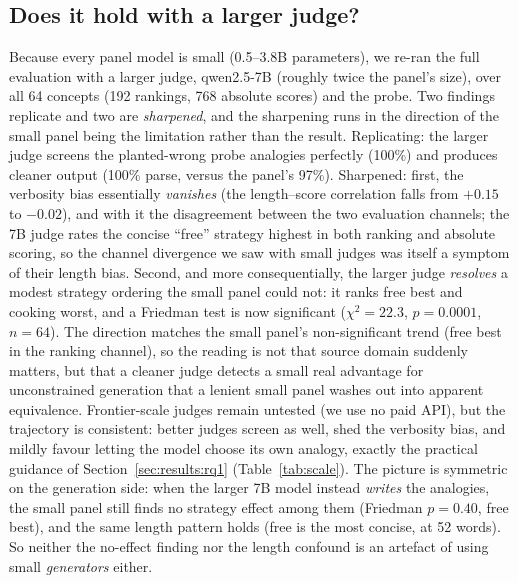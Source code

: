 \documentclass[11pt]{article}
\begin{document}
\subsection{Does it hold with a larger judge?}
\label{sec:results:scale}
Because every panel model is small (0.5--3.8B parameters), we re-ran the full evaluation with a
larger judge, qwen2.5-7B (roughly twice the panel's size), over all 64 concepts (192 rankings,
768 absolute scores) and the probe. Two findings replicate and two are \emph{sharpened}, and the
sharpening runs in the direction of the small panel being the limitation rather than the result.
Replicating: the larger judge screens the planted-wrong probe analogies perfectly (100\%) and
produces cleaner output (100\% parse, versus the panel's 97\%). Sharpened: first, the verbosity
bias essentially \emph{vanishes} (the length--score correlation falls from $+0.15$ to $-0.02$),
and with it the disagreement between the two evaluation channels; the 7B judge rates the concise
``free'' strategy highest in both ranking and absolute scoring, so the channel divergence we saw
with small judges was itself a symptom of their length bias. Second, and more consequentially, the
larger judge \emph{resolves} a modest strategy ordering the small panel could not: it ranks free
best and cooking worst, and a Friedman test is now significant ($\chi^2 = 22.3$, $p = 0.0001$,
$n = 64$). The direction matches the small panel's non-significant trend (free best in the
ranking channel), so the reading is not that source domain suddenly matters, but that a cleaner
judge detects a small real advantage for unconstrained generation that a lenient small panel
washes out into apparent equivalence. Frontier-scale judges remain untested (we use no paid API),
but the trajectory is consistent: better judges screen as well, shed the verbosity bias, and
mildly favour letting the model choose its own analogy, exactly the practical guidance of
Section~\ref{sec:results:rq1} (Table~\ref{tab:scale}). The picture is symmetric on the
generation side: when the larger 7B model instead \emph{writes} the analogies, the small panel
still finds no strategy effect among them (Friedman $p = 0.40$, free best), and the same length
pattern holds (free is the most concise, at 52 words). So neither the no-effect finding nor the
length confound is an artefact of using small \emph{generators} either.
\end{document}
